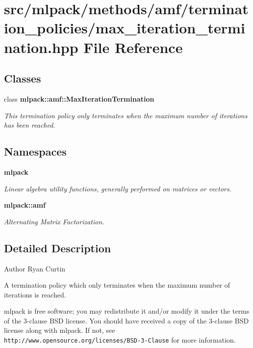 \section{src/mlpack/methods/amf/termination\+\_\+policies/max\+\_\+iteration\+\_\+termination.hpp File Reference}
\label{max__iteration__termination_8hpp}
\subsection*{Classes}
\begin{DoxyCompactItemize}
\item 
class {\bf mlpack\+::amf\+::\+Max\+Iteration\+Termination}
\begin{DoxyCompactList}\small\item\em This termination policy only terminates when the maximum number of iterations has been reached. \end{DoxyCompactList}\end{DoxyCompactItemize}
\subsection*{Namespaces}
\begin{DoxyCompactItemize}
\item 
 {\bf mlpack}
\begin{DoxyCompactList}\small\item\em Linear algebra utility functions, generally performed on matrices or vectors. \end{DoxyCompactList}\item 
 {\bf mlpack\+::amf}
\begin{DoxyCompactList}\small\item\em Alternating Matrix Factorization. \end{DoxyCompactList}\end{DoxyCompactItemize}


\subsection{Detailed Description}
\begin{DoxyAuthor}{Author}
Ryan Curtin
\end{DoxyAuthor}
A termination policy which only terminates when the maximum number of iterations is reached.

mlpack is free software; you may redistribute it and/or modify it under the terms of the 3-\/clause B\+SD license. You should have received a copy of the 3-\/clause B\+SD license along with mlpack. If not, see {\tt http\+://www.\+opensource.\+org/licenses/\+B\+S\+D-\/3-\/\+Clause} for more information. 